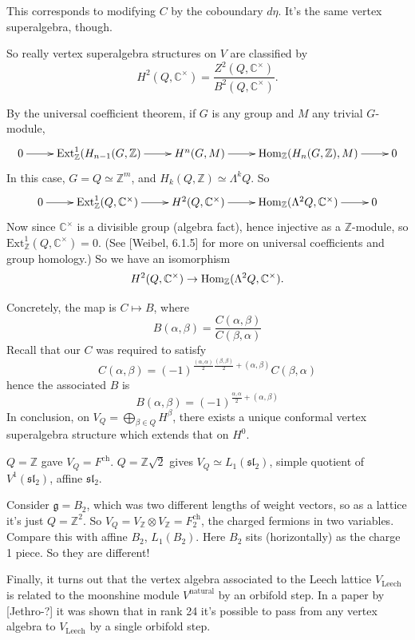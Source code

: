 This corresponds to modifying $C$ by the coboundary $d\eta$.
It's the same vertex superalgebra, though.

So really vertex superalgebra structures on $V$ 
are classified by
$$
H^{2}(Q,\mathbb{C}^\times)=\frac{Z^2(Q,\mathbb{C}^\times)}
{B^2(Q,\mathbb{C}^\times)}.
$$

\medskip\noindent
By the universal coefficient theorem,
if $G$ is any group and $M$ any trivial $G$-module,
$$
\xymatrix{
0\ar[r]&\text{Ext}^1_\mathbb{Z}(H_{n-1}(G,\mathbb{Z})\ar[r]
&H^{n}(G,M)\ar[r]
&\Hom_{\mathbb{Z}}(H_n(G,\mathbb{Z}),M)\ar[r]&0
}
$$
In this case, $G=Q\simeq \mathbb{Z}^m$, 
and $H_k(Q,\mathbb{Z}) \simeq \Lambda^kQ$.
So
$$
\xymatrix{
0\ar[r]&
\text{Ext}^1_{\mathbb{Z}}(Q,\mathbb{C}^\times)\ar[r]&
H^{2}(Q,\mathbb{C}^\times)\ar[r]&
\Hom_{\mathbb{Z}}(\Lambda^2Q,\mathbb{C}^\times)\ar[r]&0
}
$$
Now since $\mathbb{C}^\times$ is a divisible group (algebra fact),
hence injective as a $\mathbb{Z}$-module,
so $\text{Ext}^1_{\mathbb{Z}}(Q,\mathbb{C}^\times)=0$.
(See [Weibel, 6.1.5] for more on universal coefficients and group homology.)
So we have an isomorphism
$$
H^{2}(Q,\mathbb{C}^\times) \to \mathop{\mathrm{Hom}}\nolimits_{\mathbb{Z}}(\Lambda^2Q,\mathbb{C}^\times).
$$

Concretely, the map is $C \mapsto  B$, where
$$
B(\alpha,\beta)=\frac{C(\alpha,\beta)}{C(\beta,\alpha)}
$$
Recall that our $C$ was required to satisfy
$$
C(\alpha,\beta)=(-1)^{\frac{(\alpha,\alpha)}{2}\frac{(\beta,\beta)}{2}
+(\alpha,\beta)}C(\beta,\alpha)
$$
hence the associated $B$ is
$$
B(\alpha,\beta)=(-1)^{\frac{\alpha,\alpha}{2}+(\alpha,\beta)}
$$
In conclusion, on $V_Q=\bigoplus_{\beta \in Q}H^\beta$,
there exists a unique conformal vertex superalgebra structure
which extends that on $H^0$.

\medskip\noindent
$Q=\mathbb{Z}$ gave $V_Q=F^{\text{ch}}$.
$Q=\mathbb{Z}\sqrt{2}$ gives $V_Q\simeq L_1(\mathfrak{sl}_2)$,
simple quotient of $V^1(\mathfrak{sl}_2)$, affine $\mathfrak{sl}_2$.

Consider $\mathfrak{g}=B_2$, which was two different lengths of weight vectors,
so as a lattice it's just $Q=\mathbb{Z}^2$.
So $V_Q=V_\mathbb{Z} \otimes V_\mathbb{Z}=F^{\text{ch}}_2$,
the charged fermions in two variables.
Compare this with affine $B_2$, $L_1(B_2)$. Here $B_2$ sits (horizontally)
as the charge 1 piece. So they are different! 

Finally, it turns out that the vertex algebra associated
to the Leech lattice $V_{\text{Leech}}$ is related 
to the moonshine module $V^{\text{natural}}$ by
an orbifold step.
In a paper by [Jethro-?] it was shown that in
rank 24 it's possible to pass from any vertex
algebra to $V_{\text{Leech}}$ by a single orbifold step.



